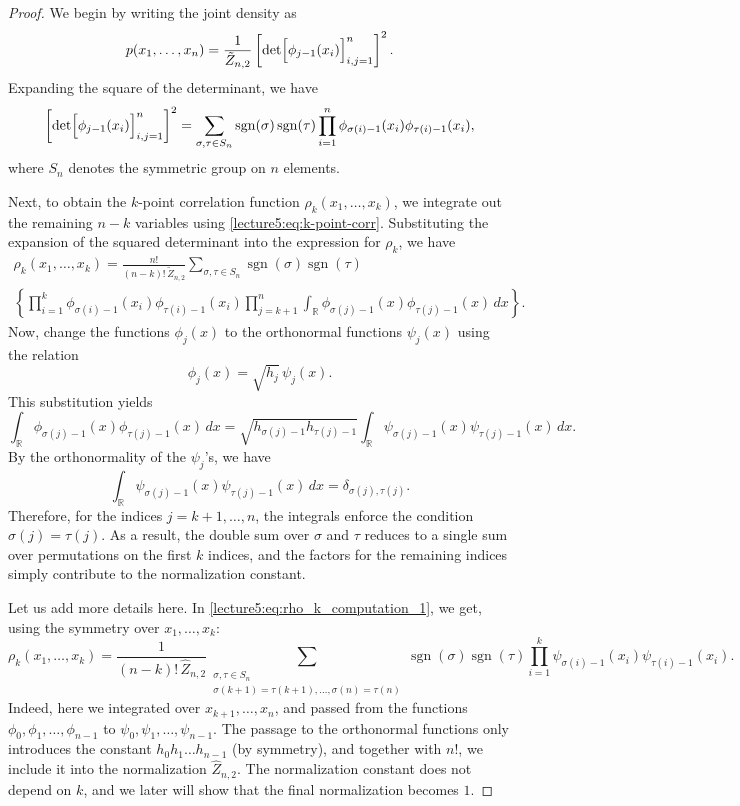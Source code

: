 \documentclass[letterpaper,11pt,oneside,reqno]{book}
\numberwithin{equation}{chapter}  %
\theoremstyle{definition}
\begin{document}
\begin{proof}
We begin by writing the joint density as
\[
p(x_1,\dots,x_n)=\frac{1}{\tilde{Z}_{n,2}} \left[\det\Bigl[\phi_{j-1}(x_i)\Bigr]_{i,j=1}^n\right]^2.
\]
Expanding the square of the determinant, we have
\[
\left[\det\Bigl[\phi_{j-1}(x_i)\Bigr]_{i,j=1}^n\right]^2 = \sum_{\sigma,\tau\in S_n} \operatorname{sgn}(\sigma)\operatorname{sgn}(\tau) \prod_{i=1}^n \phi_{\sigma(i)-1}(x_i)\phi_{\tau(i)-1}(x_i),
\]
where $S_n$ denotes the symmetric group on $n$ elements.

Next, to obtain the $k$-point correlation function $\rho_k(x_1,\dots,x_k)$, we integrate out the remaining $n-k$ variables
using \eqref{lecture5:eq:k-point-corr}.
Substituting the expansion of the squared determinant into the expression for $\rho_k$, we have
\begin{multline}
	\label{lecture5:eq:rho_k_computation_1}
\rho_k(x_1,\dots,x_k)=\frac{n!}{(n-k)!\,\tilde{Z}_{n,2}} \sum_{\sigma,\tau\in S_n} \operatorname{sgn}(\sigma)\operatorname{sgn}(\tau) \\
\left\{ \prod_{i=1}^k \phi_{\sigma(i)-1}(x_i)\phi_{\tau(i)-1}(x_i) \prod_{j=k+1}^n \int_{\mathbb{R}} \phi_{\sigma(j)-1}(x)\phi_{\tau(j)-1}(x)\,dx \right\}.
\end{multline}
Now, change the functions $\phi_j(x)$ to the orthonormal functions $\psi_j(x)$ using the relation
\[
\phi_j(x)=\sqrt{h_j}\,\psi_j(x).
\]
This substitution yields
\[
\int_{\mathbb{R}} \phi_{\sigma(j)-1}(x)\phi_{\tau(j)-1}(x)\,dx = \sqrt{h_{\sigma(j)-1}h_{\tau(j)-1}} \int_{\mathbb{R}} \psi_{\sigma(j)-1}(x)\psi_{\tau(j)-1}(x)\,dx.
\]
By the orthonormality of the $\psi_j$'s, we have
\[
\int_{\mathbb{R}} \psi_{\sigma(j)-1}(x)\psi_{\tau(j)-1}(x)\,dx = \delta_{\sigma(j),\tau(j)}.
\]
Therefore, for the indices $j=k+1,\dots,n$, the integrals enforce the condition $\sigma(j)=\tau(j)$. As a result, the double sum over $\sigma$ and $\tau$ reduces to a single sum over permutations on the first $k$ indices, and the factors for the remaining indices simply contribute to the normalization constant.

Let us add more details here.
In \eqref{lecture5:eq:rho_k_computation_1}, we get, using the symmetry over $x_1,\ldots,x_k $:
\begin{equation}
	\label{lecture5:eq:rho_k_computation_2}
	\rho_k(x_1,\dots,x_k)=\frac{1}{(n-k)!\,\widehat{Z}_{n,2}}
	\sum_{\substack{\sigma,\tau\in S_n\\
	\sigma(k+1)=\tau(k+1),\ldots,\sigma(n)=\tau(n) }} \operatorname{sgn}(\sigma)\operatorname{sgn}(\tau) 
	\prod_{i=1}^k \psi_{\sigma(i)-1}(x_i)\psi_{\tau(i)-1}(x_i)  .
\end{equation}
Indeed, here we integrated over $x_{k+1},\ldots,x_n $, and passed
from the functions $\phi_0,\phi_1,\ldots,\phi_{n-1} $
to
$\psi_0,\psi_1,\ldots,\psi_{n-1} $.
The passage to the orthonormal functions only introduces the constant 
$h_0h_1\ldots h_{n-1} $ (by symmetry), and together with $n!$, we include it into the 
normalization $\widehat{Z}_{n,2} $. The normalization constant does not depend on $k$, and 
we later will show that the final normalization becomes $1$.


\end{proof}
\end{document}
